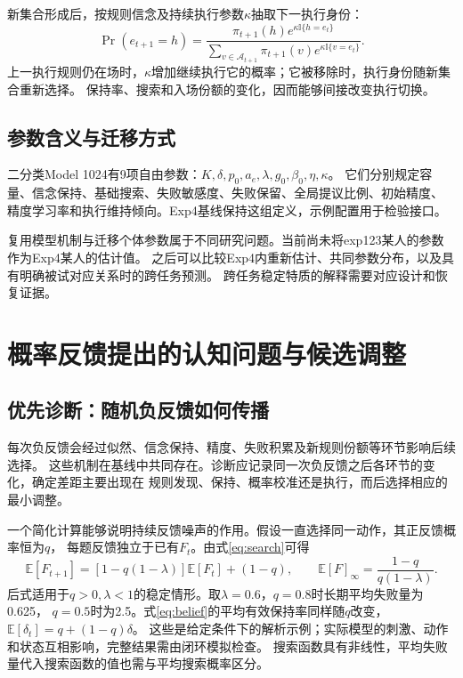 \documentclass[11pt,a4paper]{article}
\numberwithin{equation}{section}
\newcommand{\ind}{\mathbb I}
\newcommand{\A}{\mathcal A}
\begin{document}
新集合形成后，按规则信念及持续执行参数$\kappa$抽取下一执行身份：
\begin{equation}
\Pr(e_{t+1}=h)=
\frac{\pi_{t+1}(h)e^{\kappa\ind\{h=e_t\}}}
{\sum_{v\in\A_{t+1}}\pi_{t+1}(v)e^{\kappa\ind\{v=e_t\}}}.
\label{eq:execution}
\end{equation}
上一执行规则仍在场时，$\kappa$增加继续执行它的概率；它被移除时，执行身份随新集合重新选择。
保持率、搜索和入场份额的变化，因而能够间接改变执行切换。

\subsection{参数含义与迁移方式}
二分类Model 1024有9项自由参数：$K,\delta,p_0,a_e,\lambda,g_0,\beta_0,\eta,\kappa$。
它们分别规定容量、信念保持、基础搜索、失败敏感度、失败保留、全局提议比例、初始精度、
精度学习率和执行维持倾向。Exp4基线保持这组定义，示例配置用于检验接口。

复用模型机制与迁移个体参数属于不同研究问题。当前尚未将exp123某人的参数作为Exp4某人的估计值。
之后可以比较Exp4内重新估计、共同参数分布，以及具有明确被试对应关系时的跨任务预测。
跨任务稳定特质的解释需要对应设计和恢复证据。

\section{概率反馈提出的认知问题与候选调整}
\label{sec:extensions}

\subsection{优先诊断：随机负反馈如何传播}
每次负反馈会经过似然、信念保持、精度、失败积累及新规则份额等环节影响后续选择。
这些机制在基线中共同存在。诊断应记录同一次负反馈之后各环节的变化，确定差距主要出现在
规则发现、保持、概率校准还是执行，而后选择相应的最小调整。

一个简化计算能够说明持续反馈噪声的作用。假设一直选择同一动作，其正反馈概率恒为$q$，
每题反馈独立于已有$F_t$。由式\eqref{eq:search}可得
\begin{equation}
\mathbb E[F_{t+1}]=[1-q(1-\lambda)]\mathbb E[F_t]+(1-q),\qquad
\mathbb E[F]_{\infty}=\frac{1-q}{q(1-\lambda)}.
\label{eq:failure-mean}
\end{equation}
后式适用于$q>0,\lambda<1$的稳定情形。取$\lambda=0.6$，$q=0.8$时长期平均失败量为0.625，
$q=0.5$时为2.5。式\eqref{eq:belief}的平均有效保持率同样随$q$改变，
$\mathbb E[\delta_t]=q+(1-q)\delta$。
这些是给定条件下的解析示例；实际模型的刺激、动作和状态互相影响，完整结果需由闭环模拟检查。
搜索函数具有非线性，平均失败量代入搜索函数的值也需与平均搜索概率区分。
\end{document}
